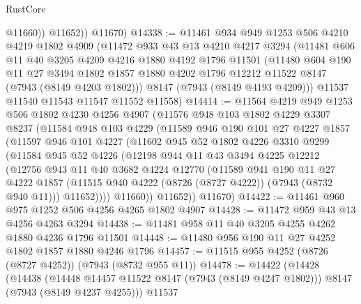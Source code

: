 \begin{lexlean}{RustCore}
\begin{coremodule}
              @11660))
          @11652))
      @11670)
@14338 := @11461
    @934
    @949
    @1253
    @506
    @4210
    @4219
    @1802
    @4909
    (@11472
      @933
      @43
      @13
      @4210
      @4217
      @3294
      (@11481
        @606
        @11
        @40
        @3205
        @4209
        @4216
        @1880
        @4192
        @1796
        @11501
        (@11480
          @604
          @190
          @11
          @27
          @3494
          @1802
          @1857
          @1880
          @4202
          @1796
          @12212
          @11522
          @8147
          (@7943 (@8149 @4203 @1802)))
        @8147
        (@7943 (@8149 @4193 @4209)))
      @11537
      @11540
      @11543
      @11547
      @11552
      @11558)
@14414 := @11564
    @4219
    @949
    @1253
    @506
    @1802
    @4230
    @4256
    @4907
    (@11576
      @948
      @103
      @1802
      @4229
      @3307
      @8237
      (@11584
        @948
        @103
        @4229
        (@11589
          @946
          @190
          @101
          @27
          @4227
          @1857
          (@11597
            @946
            @101
            @4227
            (@11602
              @945
              @52
              @1802
              @4226
              @3310
              @9299
              (@11584
                @945
                @52
                @4226
                (@12198
                  @944
                  @11
                  @43
                  @3494
                  @4225
                  @12212
                  (@12756
                    @943
                    @11
                    @40
                    @3682
                    @4224
                    @12770
                    (@11589
                      @941
                      @190
                      @11
                      @27
                      @4222
                      @1857
                      (@11515 @940 @4222 (@8726 (@8727 @4222)) (@7943 (@8732 @940 @11)))
                      @11652))))
              @11660))
          @11652))
      @11670)
@14422 := @11461 @960 @975 @1252 @506 @4256 @4265 @1802 @4907
@14428 := @11472 @959 @43 @13 @4256 @4263 @3294
@14438 := @11481 @958 @11 @40 @3205 @4255 @4262 @1880 @4236 @1796 @11501
@14448 := @11480 @956 @190 @11 @27 @4252 @1802 @1857 @1880 @4246 @1796
@14457 := @11515 @955 @4252 (@8726 (@8727 @4252)) (@7943 (@8732 @955 @11))
@14478 := @14422
    (@14428
      (@14438
        (@14448 @14457 @11522 @8147 (@7943 (@8149 @4247 @1802)))
        @8147
        (@7943 (@8149 @4237 @4255)))
      @11537

\end{coremodule}
\end{lexlean}
